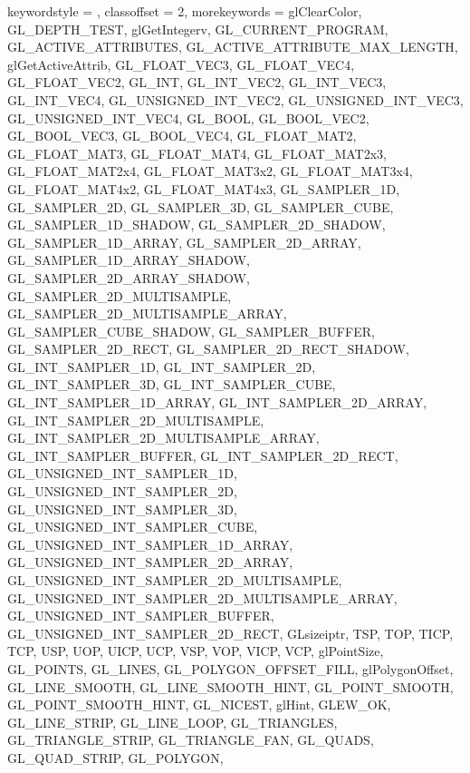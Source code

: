 {{		keywordstyle = {\color[rgb]{0.0, 0.0, 0.70}},
		classoffset = 2,
		morekeywords = {
            glClearColor,
            GL_DEPTH_TEST,
            glGetIntegerv, 
            GL_CURRENT_PROGRAM,
            GL_ACTIVE_ATTRIBUTES,
            GL_ACTIVE_ATTRIBUTE_MAX_LENGTH,
            glGetActiveAttrib,
            GL_FLOAT_VEC3,
            GL_FLOAT_VEC4,
            GL_FLOAT_VEC2,
            GL_INT,
            GL_INT_VEC2,
            GL_INT_VEC3,
            GL_INT_VEC4,
            GL_UNSIGNED_INT_VEC2,
            GL_UNSIGNED_INT_VEC3,
            GL_UNSIGNED_INT_VEC4,
            GL_BOOL,
            GL_BOOL_VEC2,
            GL_BOOL_VEC3,
            GL_BOOL_VEC4,
            GL_FLOAT_MAT2,
            GL_FLOAT_MAT3,
            GL_FLOAT_MAT4,
            GL_FLOAT_MAT2x3,
            GL_FLOAT_MAT2x4,
            GL_FLOAT_MAT3x2,
            GL_FLOAT_MAT3x4,
            GL_FLOAT_MAT4x2,
            GL_FLOAT_MAT4x3,
            GL_SAMPLER_1D,
            GL_SAMPLER_2D,
            GL_SAMPLER_3D,
            GL_SAMPLER_CUBE,
            GL_SAMPLER_1D_SHADOW,
            GL_SAMPLER_2D_SHADOW,
            GL_SAMPLER_1D_ARRAY,
            GL_SAMPLER_2D_ARRAY,
            GL_SAMPLER_1D_ARRAY_SHADOW,
            GL_SAMPLER_2D_ARRAY_SHADOW,
            GL_SAMPLER_2D_MULTISAMPLE,
            GL_SAMPLER_2D_MULTISAMPLE_ARRAY,
            GL_SAMPLER_CUBE_SHADOW,
            GL_SAMPLER_BUFFER,
            GL_SAMPLER_2D_RECT,
            GL_SAMPLER_2D_RECT_SHADOW,
            GL_INT_SAMPLER_1D,
            GL_INT_SAMPLER_2D,
            GL_INT_SAMPLER_3D,
            GL_INT_SAMPLER_CUBE,
            GL_INT_SAMPLER_1D_ARRAY,
            GL_INT_SAMPLER_2D_ARRAY,
            GL_INT_SAMPLER_2D_MULTISAMPLE,
            GL_INT_SAMPLER_2D_MULTISAMPLE_ARRAY,
            GL_INT_SAMPLER_BUFFER,
            GL_INT_SAMPLER_2D_RECT,
            GL_UNSIGNED_INT_SAMPLER_1D,
            GL_UNSIGNED_INT_SAMPLER_2D,
            GL_UNSIGNED_INT_SAMPLER_3D,
            GL_UNSIGNED_INT_SAMPLER_CUBE,
            GL_UNSIGNED_INT_SAMPLER_1D_ARRAY,
            GL_UNSIGNED_INT_SAMPLER_2D_ARRAY,
            GL_UNSIGNED_INT_SAMPLER_2D_MULTISAMPLE,
            GL_UNSIGNED_INT_SAMPLER_2D_MULTISAMPLE_ARRAY,
            GL_UNSIGNED_INT_SAMPLER_BUFFER,
            GL_UNSIGNED_INT_SAMPLER_2D_RECT,
            GLsizeiptr,
            TSP, TOP, TICP, TCP, USP, UOP, UICP, UCP, VSP, VOP, VICP, VCP, glPointSize,
			GL_POINTS, GL_LINES, GL_POLYGON_OFFSET_FILL, glPolygonOffset, GL_LINE_SMOOTH, GL_LINE_SMOOTH_HINT, GL_POINT_SMOOTH, GL_POINT_SMOOTH_HINT, GL_NICEST, glHint, GLEW_OK, GL_LINE_STRIP, GL_LINE_LOOP, GL_TRIANGLES, GL_TRIANGLE_STRIP, GL_TRIANGLE_FAN, GL_QUADS, GL_QUAD_STRIP, GL_POLYGON,
}}}
